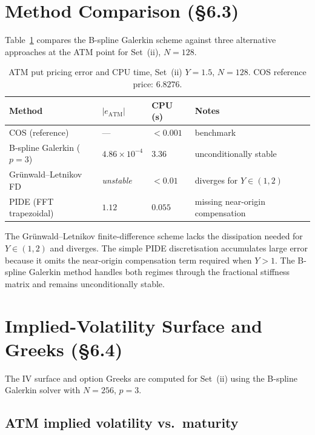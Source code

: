 \documentclass[11pt,a4paper]{article}
\begin{document}
\section{Method Comparison (\S6.3)}

Table~\ref{tab:method_comparison} compares the B-spline Galerkin scheme
against three alternative approaches at the ATM point for Set~(ii), $N=128$.

\begin{table}[ht]
\centering
\caption{ATM put pricing error and CPU time, Set~(ii) $Y=1.5$, $N=128$.
COS reference price: $6.8276$.}
\label{tab:method_comparison}
\begin{tabular}{llll}
\toprule
Method & $|e_{\mathrm{ATM}}|$ & CPU (s) & Notes \\
\midrule
COS (reference)           & ---                  & $<0.001$ & benchmark \\
B-spline Galerkin ($p=3$) & $4.86\times10^{-4}$  & $3.36$   & unconditionally stable \\
Gr\"unwald--Letnikov FD   & \textit{unstable}    & $<0.01$  & diverges for $Y\in(1,2)$ \\
PIDE (FFT trapezoidal)    & $1.12$               & $0.055$  & missing near-origin compensation \\
\bottomrule
\end{tabular}
\end{table}

The Gr\"unwald--Letnikov finite-difference scheme lacks the dissipation needed
for $Y\in(1,2)$ and diverges.  The simple PIDE discretisation accumulates
large error because it omits the near-origin compensation term required when
$Y>1$.  The B-spline Galerkin method handles both regimes through the
fractional stiffness matrix and remains unconditionally stable.

\section{Implied-Volatility Surface and Greeks (\S6.4)}

The IV surface and option Greeks are computed for Set~(ii) using the B-spline
Galerkin solver with $N=256$, $p=3$.

\subsection{ATM implied volatility vs.\ maturity}
\end{document}
